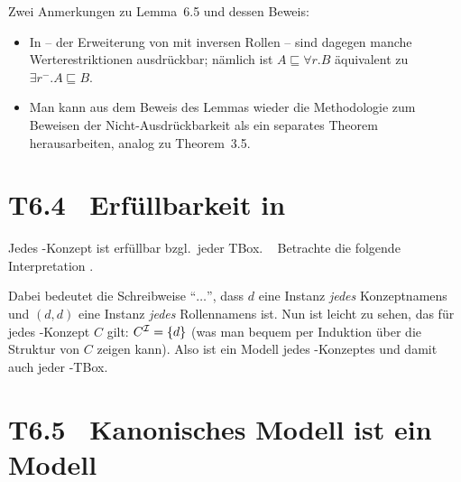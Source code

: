 \documentclass[fontsize=11pt, twoside=false, numbers=autoenddot]{scrbook}
\begin{document}
Zwei Anmerkungen zu Lemma~6.5 und dessen Beweis:
%
\begin{itemize}
  \item 
    In \ELI{} -- der Erweiterung von \EL mit inversen Rollen --
    sind dagegen manche Werterestriktionen ausdrückbar;
    nämlich ist $A \sqsubseteq \forall r.B$ äquivalent zu $\exists r^-.A \sqsubseteq B$.
  \item
    Man kann aus dem Beweis des Lemmas wieder die Methodologie
    zum Beweisen der Nicht-Ausdrückbarkeit als ein separates Theorem
    herausarbeiten, analog zu Theorem~3.5.
\end{itemize}


\section*{T6.4~ {\boldmath Erfüllbarkeit in \EL}}

Jedes \EL-Konzept ist erfüllbar bzgl.\ jeder TBox.
%
\parII
{}~
Betrachte die folgende Interpretation \Imc.
%
\begin{center}
\end{center}
%
Dabei bedeutet die Schreibweise "`$\dots$"', dass $d$ eine Instanz \emph{jedes} Konzeptnamens
und $(d,d)$ eine Instanz \emph{jedes} Rollennamens ist.
Nun ist leicht zu sehen, das für jedes \EL-Konzept $C$ gilt: $C^\mathcal{I} = \{d\}$
(was man bequem per Induktion über die Struktur von $C$ zeigen kann).
Also ist \Imc ein Modell jedes \EL-Konzeptes
und damit auch jeder \EL-TBox.
\qedhere

\section*{T6.5~ Kanonisches Modell ist ein Modell}
\end{document}
